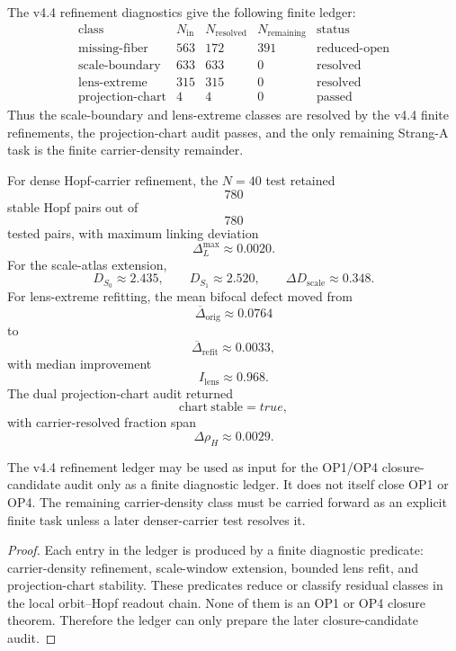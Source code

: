 \begin{proposition}
The v4.4 refinement diagnostics give the following finite ledger:
\[
\begin{array}{c|r|r|r|c}
\text{class} & N_{\mathrm{in}} & N_{\mathrm{resolved}} & N_{\mathrm{remaining}} & \text{status}\\
\hline
\mathrm{missing\text{-}fiber} & 563 & 172 & 391 & \mathrm{reduced\text{-}open}\\
\mathrm{scale\text{-}boundary} & 633 & 633 & 0 & \mathrm{resolved}\\
\mathrm{lens\text{-}extreme} & 315 & 315 & 0 & \mathrm{resolved}\\
\mathrm{projection\text{-}chart} & 4 & 4 & 0 & \mathrm{passed}
\end{array}
\]
Thus the scale-boundary and lens-extreme classes are resolved by the v4.4
finite refinements, the projection-chart audit passes, and the only remaining
Strang-A task is the finite carrier-density remainder.
\end{proposition}

\begin{remark}
For dense Hopf-carrier refinement, the \(N=40\) test retained
\[
    780
\]
stable Hopf pairs out of
\[
    780
\]
tested pairs, with maximum linking deviation
\[
    \Delta_L^{\max}\approx 0.0020.
\]
For the scale-atlas extension,
\[
    D_{S_0}\approx 2.435,\qquad
    D_{S_1}\approx 2.520,\qquad
    \Delta D_{\mathrm{scale}}\approx 0.348.
\]
For lens-extreme refitting, the mean bifocal defect moved from
\[
    \overline{\Delta}_{\mathrm{orig}}\approx 0.0764
\]
to
\[
    \overline{\Delta}_{\mathrm{refit}}\approx 0.0033,
\]
with median improvement
\[
    I_{\mathrm{lens}}\approx 0.968.
\]
The dual projection-chart audit returned
\[
    \mathrm{chart\ stable}=true,
\]
with carrier-resolved fraction span
\[
    \Delta\rho_H\approx 0.0029.
\]
\end{remark}

\begin{theorem}
The v4.4 refinement ledger may be used as input for the OP1/OP4
closure-candidate audit only as a finite diagnostic ledger.  It does not
itself close OP1 or OP4.  The remaining carrier-density class must be carried
forward as an explicit finite task unless a later denser-carrier test resolves
it.
\end{theorem}

\begin{proof}
Each entry in the ledger is produced by a finite diagnostic predicate:
carrier-density refinement, scale-window extension, bounded lens refit, and
projection-chart stability.  These predicates reduce or classify residual
classes in the local orbit--Hopf readout chain.  None of them is an OP1 or OP4
closure theorem.  Therefore the ledger can only prepare the later
closure-candidate audit.
\end{proof}


